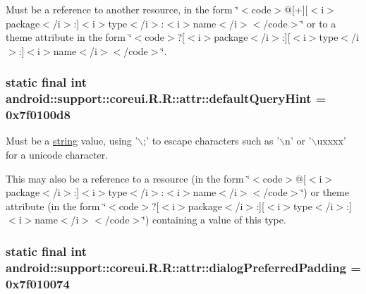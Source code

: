Must be a reference to another resource, in the form \char`\"{}$<$code$>$@\mbox{[}+\mbox{]}\mbox{[}$<$i$>$package$<$/i$>$:\mbox{]}$<$i$>$type$<$/i$>$:$<$i$>$name$<$/i$>$$<$/code$>$\char`\"{} or to a theme attribute in the form \char`\"{}$<$code$>$?\mbox{[}$<$i$>$package$<$/i$>$:\mbox{]}\mbox{[}$<$i$>$type$<$/i$>$:\mbox{]}$<$i$>$name$<$/i$>$$<$/code$>$\char`\"{}. \hypertarget{classandroid_1_1support_1_1coreui_1_1_r_1_1attr_0c1d4b1166dd05553e80ca92ba8c4dd3}{
\subsubsection[{defaultQueryHint}]{\setlength{\rightskip}{0pt plus 5cm}static final int android::support::coreui.R.R::attr::defaultQueryHint = 0x7f0100d8}}
\label{classandroid_1_1support_1_1coreui_1_1_r_1_1attr_0c1d4b1166dd05553e80ca92ba8c4dd3}


Must be a \hyperlink{classandroid_1_1support_1_1coreui_1_1_r_1_1string}{string} value, using '$\backslash$;' to escape characters such as '$\backslash$n' or '$\backslash$uxxxx' for a unicode character. 

This may also be a reference to a resource (in the form \char`\"{}$<$code$>$@\mbox{[}$<$i$>$package$<$/i$>$:\mbox{]}$<$i$>$type$<$/i$>$:$<$i$>$name$<$/i$>$$<$/code$>$\char`\"{}) or theme attribute (in the form \char`\"{}$<$code$>$?\mbox{[}$<$i$>$package$<$/i$>$:\mbox{]}\mbox{[}$<$i$>$type$<$/i$>$:\mbox{]}$<$i$>$name$<$/i$>$$<$/code$>$\char`\"{}) containing a value of this type. \hypertarget{classandroid_1_1support_1_1coreui_1_1_r_1_1attr_a31025ecfd75557a190ba4b01a26eaf3}{
\subsubsection[{dialogPreferredPadding}]{\setlength{\rightskip}{0pt plus 5cm}static final int android::support::coreui.R.R::attr::dialogPreferredPadding = 0x7f010074}}
\label{classandroid_1_1support_1_1coreui_1_1_r_1_1attr_a31025ecfd75557a190ba4b01a26eaf3}


